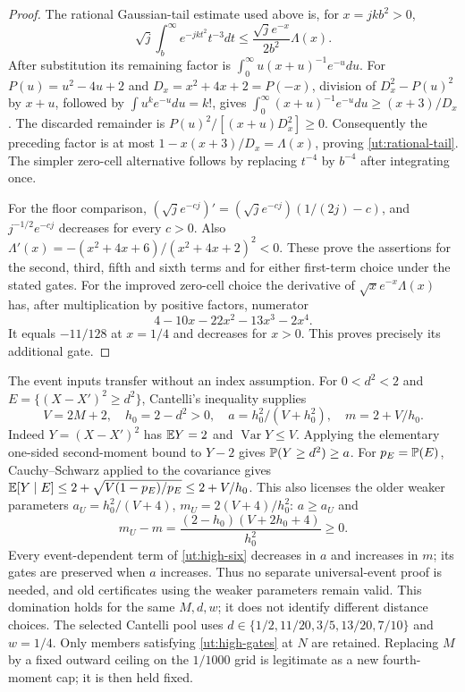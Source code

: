 \begin{proof}
The rational Gaussian-tail estimate used above is, for $x=jk b^2>0$,
\begin{equation}\label{ut:rational-tail}
 \sqrt j\int_b^\infty e^{-jkt^2}t^{-3}dt
 \le\frac{\sqrt j e^{-x}}{2b^2}\Lambda(x).
\end{equation}
After substitution its remaining factor is
$\int_0^\infty u(x+u)^{-1}e^{-u}du$.
For $P(u)=u^2-4u+2$ and $D_x=x^2+4x+2=P(-x)$,
division of $D_x^2-P(u)^2$ by $x+u$, followed by
$\int u^ke^{-u}du=k!$, gives
$\int_0^\infty (x+u)^{-1}e^{-u}du\ge(x+3)/D_x$.
The discarded remainder is $P(u)^2/[(x+u)D_x^2]\ge0$.
Consequently the preceding factor is at most
$1-x(x+3)/D_x=\Lambda(x)$, proving
\eqref{ut:rational-tail}. The simpler zero-cell alternative follows
by replacing $t^{-4}$ by $b^{-4}$ after integrating once.

For the floor comparison,
$(\sqrt j e^{-cj})'=(\sqrt j e^{-cj})(1/(2j)-c)$,
and $j^{-1/2}e^{-cj}$ decreases for every $c>0$.
Also $\Lambda'(x)=-(x^2+4x+6)/(x^2+4x+2)^2<0$.
These prove the assertions for the second, third, fifth and sixth
terms and for either first-term choice under the stated gates.
For the improved zero-cell choice the derivative of
$\sqrt x e^{-x}\Lambda(x)$ has, after multiplication by positive
factors, numerator
\[
 4-10x-22x^2-13x^3-2x^4.
\]
It equals $-11/128$ at $x=1/4$ and decreases for $x>0$.
This proves precisely its additional gate.
\end{proof}

The event inputs transfer without an index assumption. For $0<d^2<2$
and $E=\{(X-X')^2\ge d^2\}$, Cantelli's inequality supplies
\[
 V=2M+2,\quad h_0=2-d^2>0,\quad
 a=h_0^2/(V+h_0^2),\quad m=2+V/h_0.
\]
Indeed $Y=(X-X')^2$ has $\mathbb E Y=2$ and
$\operatorname{Var}Y\le V$. Applying the elementary one-sided
second-moment bound to $Y-2$ gives $\mathbb P(Y\ge d^2)\ge a$.
For $p_E=\mathbb P(E)$, Cauchy--Schwarz applied to the covariance gives
$\mathbb E[Y\mid E]\le2+\sqrt{V(1-p_E)/p_E}\le2+V/h_0$.
This also licenses the older weaker parameters
$a_U=h_0^2/(V+4)$, $m_U=2(V+4)/h_0^2$:
$a\ge a_U$ and
\[
 m_U-m=\frac{(2-h_0)(V+2h_0+4)}{h_0^2}\ge0.
\]
Every event-dependent term of \eqref{ut:high-six} decreases in $a$
and increases in $m$; its gates are preserved when $a$ increases.
Thus no separate universal-event proof is needed, and old certificates
using the weaker parameters remain valid. This domination holds for
the same $M,d,w$; it does not identify different distance choices.
The selected Cantelli pool uses
$d\in\{1/2,11/20,3/5,13/20,7/10\}$ and $w=1/4$.
Only members satisfying \eqref{ut:high-gates} at $N$ are retained.
Replacing $M$ by a fixed outward ceiling on the $1/1000$ grid
is legitimate as a new fourth-moment cap; it is then held fixed.

